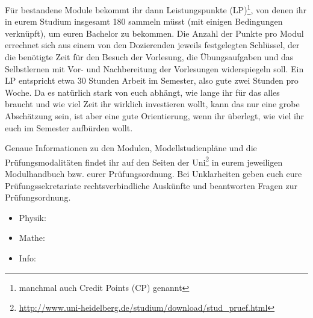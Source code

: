 Für bestandene Module bekommt ihr dann Leistungspunkte (\gls{LP})\footnote{manchmal auch Credit Points (\gls{CP}) genannt}, von denen ihr in eurem Studium insgesamt 180 sammeln müsst (mit einigen Bedingungen verknüpft), um euren Bachelor zu bekommen. Die Anzahl der Punkte pro Modul errechnet sich aus einem von den Dozierenden jeweils festgelegten Schlüssel, der die benötigte Zeit für den Besuch der Vorlesung, die Übungsaufgaben und das Selbstlernen mit Vor- und Nachbereitung der Vorlesungen widerspiegeln soll. Ein \gls{LP} entspricht etwa 30 Stunden Arbeit im Semester, also gute zwei Stunden pro Woche. Da es natürlich stark von euch abhängt, wie lange ihr für das alles braucht und wie viel Zeit ihr wirklich investieren wollt, kann das nur eine grobe Abschätzung sein, ist aber eine gute Orientierung, wenn ihr überlegt, wie viel ihr euch im Semester aufbürden wollt.

Genaue Informationen zu den Modulen, Modellstudienpläne und die Prüfungsmodalitäten findet ihr auf den Seiten der Uni\footnote{\url{http://www.uni-heidelberg.de/studium/download/stud_pruef.html}} in eurem jeweiligen Modulhandbuch bzw. eurer Prüfungsordnung. Bei Unklarheiten geben euch eure Prüfungssekretariate rechtsverbindliche Auskünfte und beantworten Fragen zur Prüfungsordnung. 
\begin{itemize}
	\item Physik: \pruefsekphysik
	\item Mathe: \pruefsekmathe
	\item Info: \pruefsekinfo
\end{itemize}


